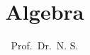 


\subject{Vorlesung aus dem WS21/22}
\title{Algebra}
\author{Prof. \,Dr.~N. S.}%
\date{}
\publishers{\small ge{\TeX}t von Ningh}
\maketitle
\thispagestyle{empty}
\tableofcontents
\clearpage





% 
% 

